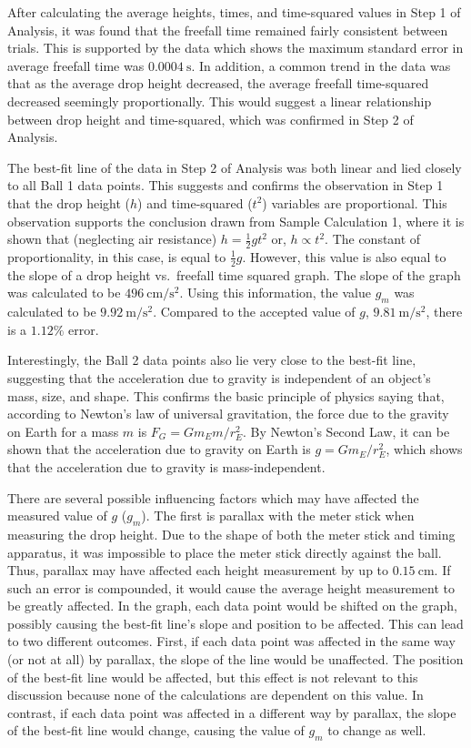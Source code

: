 \documentclass[12pt]{article}
\begin{document}
	\begin{discussion}
		After calculating the average heights, times, and time-squared values in Step 1 of Analysis, it was found that the freefall time remained fairly consistent between trials. This is supported by the data which shows the maximum standard error in average freefall time was $\SI{0.0004}{\second}$. In addition, a common trend in the data was that as the average drop height decreased, the average freefall time-squared decreased seemingly proportionally. This would suggest a linear relationship between drop height and time-squared, which was confirmed in Step 2 of Analysis.
		
		The best-fit line of the data in Step 2 of Analysis was both linear and lied closely to all Ball 1 data points. This suggests and confirms the observation in Step 1 that the drop height ($h$) and time-squared ($t^2$) variables are proportional. This observation supports the conclusion drawn from Sample Calculation 1, where it is shown that (neglecting air resistance) $h=\frac12gt^2$ or, $h\propto t^2$. The constant of proportionality, in this case, is equal to $\frac12g$. However, this value is also equal to the slope of a  drop height vs.\ freefall time squared graph. The slope of the graph was calculated to be $\SI{496}{\centi\meter/\second^2}$. Using this information, the value $g_m$ was calculated to be $\SI{9.92}{\meter/\second^2}$. Compared to the accepted value of $g$, $\SI{9.81}{\meter/\second^2}$, there is a $1.12\%$ error. 
		
		Interestingly, the Ball 2 data points also lie very close to the best-fit line, suggesting that the acceleration due to gravity is independent of an object's mass, size, and shape. This confirms the basic principle of physics saying that, according to Newton's law of universal gravitation, the force due to the gravity on Earth for a mass $m$ is $F_G=Gm_Em/r_E^2$. By Newton's Second Law, it can be shown that the acceleration due to gravity on Earth is $g=Gm_E/r_E^2$, which shows that the acceleration due to gravity is mass-independent.
		
		There are several possible influencing factors which may have affected the measured value of $g$ ($g_m$). The first is parallax with the meter stick when measuring the drop height. Due to the shape of both the meter stick and timing apparatus, it was impossible to place the meter stick directly against the ball. Thus, parallax may have affected each height measurement by up to $\SI{0.15}{\centi\meter}$. If such an error is compounded, it would cause the average height measurement to be greatly affected. In the graph, each data point would be shifted on the graph, possibly causing the best-fit line's slope and position to be affected. This can lead to two different outcomes. First, if each data point was affected in the same way (or not at all) by parallax, the slope of the line would be unaffected. The position of the best-fit line would be affected, but this effect is not relevant to this discussion because none of the calculations are dependent on this value. In contrast, if each data point was affected in a different way by parallax, the slope of the best-fit line would change, causing the value of $g_m$ to change as well.
		

\end{discussion}
\end{document}
